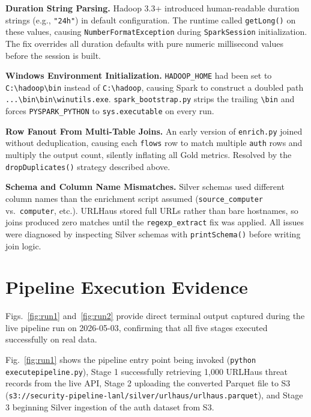 \documentclass[conference]{IEEEtran}
\begin{document}
\textbf{Duration String Parsing.} Hadoop 3.3+ introduced human-readable duration strings (e.g., \texttt{"24h"}) in default configuration. The runtime called \texttt{getLong()} on these values, causing \texttt{NumberFormatException} during \texttt{SparkSession} initialization. The fix overrides all duration defaults with pure numeric millisecond values before the session is built.

\textbf{Windows Environment Initialization.} \texttt{HADOOP\_HOME} had been set to \texttt{C:\textbackslash hadoop\textbackslash bin} instead of \texttt{C:\textbackslash hadoop}, causing Spark to construct a doubled path \texttt{...\textbackslash bin\textbackslash bin\textbackslash winutils.exe}. \texttt{spark\_bootstrap.py} strips the trailing \texttt{\textbackslash bin} and forces \texttt{PYSPARK\_PYTHON} to \texttt{sys.executable} on every run.

\textbf{Row Fanout From Multi-Table Joins.} An early version of \texttt{enrich.py} joined without deduplication, causing each \texttt{flows} row to match multiple \texttt{auth} rows and multiply the output count, silently inflating all Gold metrics. Resolved by the \texttt{dropDuplicates()} strategy described above.

\textbf{Schema and Column Name Mismatches.} Silver schemas used different column names than the enrichment script assumed (\texttt{source\_computer} vs.\ \texttt{computer}, etc.). URLHaus stored full URLs rather than bare hostnames, so joins produced zero matches until the \texttt{regexp\_extract} fix was applied. All issues were diagnosed by inspecting Silver schemas with \texttt{printSchema()} before writing join logic.

\section{Pipeline Execution Evidence}
\label{sec:evidence}

Figs.~\ref{fig:run1} and~\ref{fig:run2} provide direct terminal output captured during the live pipeline run on 2026-05-03, confirming that all five stages executed successfully on real data.

Fig.~\ref{fig:run1} shows the pipeline entry point being invoked (\texttt{python executepipeline.py}), Stage 1 successfully retrieving 1,000 URLHaus threat records from the live API, Stage 2 uploading the converted Parquet file to S3 (\texttt{s3://security-pipeline-lanl/silver/urlhaus/urlhaus.parquet}), and Stage 3 beginning Silver ingestion of the auth dataset from S3.
\end{document}
